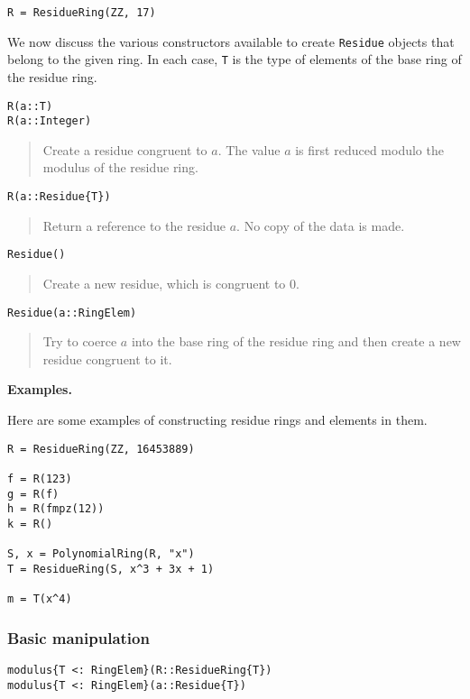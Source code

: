 \documentclass[a4paper,10pt]{article}
\newcommand{\code}{\lstinline}
\newcommand{\desc}[1]{\vspace{-3mm}\begin{quote}#1\end{quote}}
\begin{document}
\begin{lstlisting}
R = ResidueRing(ZZ, 17)
\end{lstlisting}

We now discuss the various constructors available to create \code{Residue}
objects that belong to the given ring. In each case, \code{T} is the type of
elements of the base ring of the residue ring.

\begin{lstlisting}
R(a::T)
R(a::Integer)  
\end{lstlisting}

\desc{Create a residue congruent to $a$. The value $a$ is first reduced
modulo the modulus of the residue ring.}

\begin{lstlisting}
R(a::Residue{T})  
\end{lstlisting}

\desc{Return a reference to the residue $a$. No copy of the data is made.}

\begin{lstlisting}
Residue()
\end{lstlisting}

\desc{Create a new residue, which is congruent to $0$.}

\begin{lstlisting}
Residue(a::RingElem)
\end{lstlisting}

\desc{Try to coerce $a$ into the base ring of the residue ring and then
create a new residue congruent to it.}

\textbf{Examples.}

Here are some examples of constructing residue rings and elements in them.

\begin{lstlisting}
R = ResidueRing(ZZ, 16453889)

f = R(123)
g = R(f)
h = R(fmpz(12))
k = R()

S, x = PolynomialRing(R, "x")
T = ResidueRing(S, x^3 + 3x + 1)

m = T(x^4)
\end{lstlisting}

\subsubsection{Basic manipulation}

\begin{lstlisting}
modulus{T <: RingElem}(R::ResidueRing{T})
modulus{T <: RingElem}(a::Residue{T})
\end{lstlisting}
\end{document}
